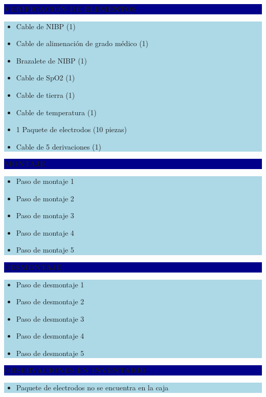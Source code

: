 \documentclass[11pt]{article}
\newcommand{\seccionbanda}[1]{%
  \vspace{0.6em}
  \noindent\colorbox{darkblue}{\parbox{\dimexpr\linewidth-2\fboxsep}{%
    \centering\color{white}\bfseries #1}}\par\vspace{0.6em}
}
\begin{document}
\newpage
\seccionbanda{VERIFICACIÓN DE ELEMENTOS}
\noindent\colorbox{lightblue}{\parbox{\dimexpr\linewidth-2\fboxsep\relax}{%
\begin{itemize}[label=$\square$, itemsep=4pt]
\item Cable de NIBP (1)
\item Cable de alimenación de grado médico (1)
\item Brazalete de NIBP (1)
\item Cable de SpO2 (1)
\item Cable de tierra (1)
\item Cable de temperatura (1)
\item 1 Paquete de electrodos (10 piezas)
\item Cable de 5 derivaciones (1)
\end{itemize}
}}\par

\seccionbanda{MONTAJE}
\noindent\colorbox{lightblue}{\parbox{\dimexpr\linewidth-2\fboxsep\relax}{%
\begin{itemize}[label=$\square$, itemsep=4pt]
\item Paso de montaje 1
\item Paso de montaje 2
\item Paso de montaje 3
\item Paso de montaje 4
\item Paso de montaje 5
\end{itemize}
}}\par

\seccionbanda{DESMONTAJE}
\noindent\colorbox{lightblue}{\parbox{\dimexpr\linewidth-2\fboxsep\relax}{%
\begin{itemize}[label=$\square$, itemsep=4pt]
\item Paso de desmontaje 1
\item Paso de desmontaje 2
\item Paso de desmontaje 3
\item Paso de desmontaje 4
\item Paso de desmontaje 5
\end{itemize}
}}\par
\seccionbanda{OBSERVACIONES EN INVENTARIO}
\noindent\colorbox{lightblue}{\parbox{\dimexpr\linewidth-2\fboxsep\relax}{\begin{itemize}[itemsep=4pt]
\item Paquete de electrodos no se encuentra en la caja
\end{itemize}}}\par
\end{document}
